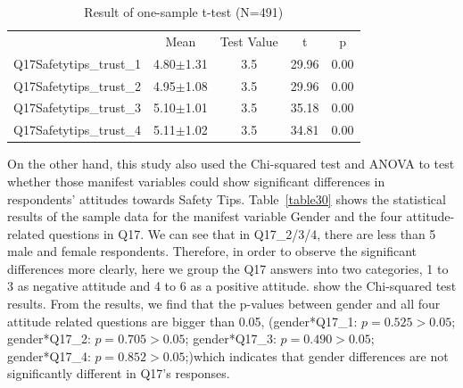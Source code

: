 \begin{table}[h]
  \caption[Result of one-sample t-test]{Result of one-sample t-test (N=491)}
  \label{table29}
  \centering
  \begin{tabular}{l|cccc}
 \hline
                  & Mean                 & Test Value & t                          & p                        \\
Q17Safetytips\_trust\_1 & 4.80$\pm$1.31            & 3.5                            & 29.96 & 0.00 \\
Q17Safetytips\_trust\_2 & 4.95$\pm$1.08            & 3.5                            & 29.96 & 0.00 \\
Q17Safetytips\_trust\_3 & 5.10$\pm$1.01            & 3.5                            & 35.18 & 0.00 \\
Q17Safetytips\_trust\_4 & 5.11$\pm$1.02            & 3.5                            & 34.81 & 0.00 \\
 \hline
  \end{tabular}
\end{table}

On the other hand, this study also used the Chi-squared test and ANOVA to test whether those manifest variables could show significant differences in respondents' attitudes towards Safety Tips. Table~\ref{table30} shows the statistical results of the sample data for the manifest variable Gender and the four attitude-related questions in Q17. We can see that in Q17\_2/3/4, there are less than 5 male and female respondents. Therefore, in order to observe the significant differences more clearly, here we group the Q17 answers into two categories, 1 to 3 as negative attitude and 4 to 6 as a positive attitude.  show the Chi-squared test results. From the results, we find that the p-values between gender and all four attitude related questions are bigger than 0.05, (gender*Q17\_1: $p=0.525>0.05$; gender*Q17\_2: $p=0.705>0.05$; gender*Q17\_3: $p=0.490>0.05$; gender*Q17\_4: $p=0.852>0.05$;)which indicates that gender differences are not significantly different in Q17's responses. 

